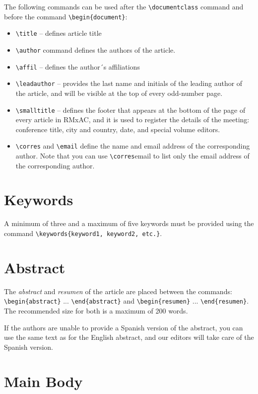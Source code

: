 \documentclass[10pt,letter,twoside]{rmaa-rho-class/rmac-rho}
\newcommand{\CS}[1]{\texttt{\textbackslash #1}}
\begin{document}
The following commands can be used after the \CS{documentclass} command and before the command \CS{begin}\verb|{document}|: %

\begin{itemize}
    \item \CS{title} -- defines article title
    \item \CS{author} command defines the authors of the article.
    \item \CS{affil} -- defines the author´s affiliations
    \item \CS{leadauthor} -- provides the last name and initials of the leading author of the article, and will be visible at the top of every odd-number page.
    \item \CS{smalltitle} -- defines the footer that appears at the bottom of the page of every article in RMxAC, and it is used to register the details of the meeting: conference title, city and country, date, and special volume editors.
    \item \CS{corres} and \CS{email} define the name and email address of the corresponding author. Note that you can use \CS{corres}{email} to list only the email address of the corresponding author.
\end{itemize}

\section{Keywords}

A minimum of three and a maximum of five keywords must be provided using the command \verb|\keywords{keyword1, keyword2, etc.}|. 


\section{Abstract}

The {\it abstract} and {\it resumen} of the article are placed between the commands: \CS{begin}\verb|{abstract}| ... \CS{end}\verb|{abstract}| and \CS{begin}\verb|{resumen}| ... \CS{end}\verb|{resumen}|. The recommended size for both is a maximum of 200 words.

If the authors are unable to provide a Spanish version of the abstract, you can use the same text as for the English abstract, and our editors will take care of the Spanish version.
 



\section{Main Body}
\end{document}
